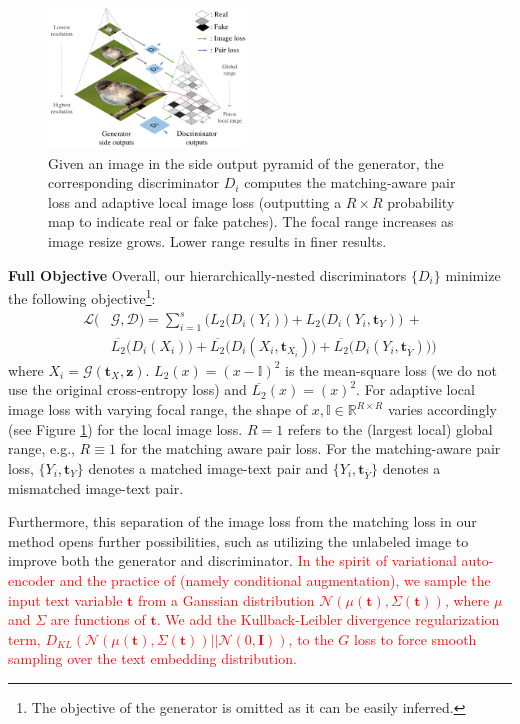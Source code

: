\documentclass[10pt,twocolumn,letterpaper]{article}
\begin{document}
\begin{figure}[t]
	\centering
	\includegraphics[width=0.47\textwidth]{figure/loss.pdf}
	
	\caption{Given an image in the side output pyramid of the generator, the corresponding discriminator $D_i$ computes the matching-aware pair loss and adaptive local image loss (outputting a $R{\times}R$ probability map to indicate real or fake patches). The focal range increases as image resize grows. Lower range results in finer results. } 
	\label{fig:loss}
\end{figure}


\textbf{Full Objective } Overall, our hierarchically-nested discriminators $\{D_i\}$ minimize the following objective\footnote{The objective of the generator is omitted as it can be easily inferred.}:
\begin{equation}
\begin{split}
\mathcal{L}(& \mathcal{G}, \mathcal{D})  = \sum_{i=1}^{s} \Big(  L_2\big(D_i({Y}_i)\big) +  L_2\big(D_i({Y}_i, \bm t_{Y})\big) \, + \\ 
& \overline{L_2}\big(D_i({X}_i)\big)  + \overline{L_2}\big(D_i({X}_i, \bm{t}_{X_i})\big) + \overline{L_2}\big(D_i({Y}_i,  \bm{t}_{\overline{Y}})\big) \Big)
\end{split}
\end{equation}
where ${X}_i = \mathcal{G}(\bm{t}_{X}, \bm z)$. $L_2(x) = (x - \mathbb{I})^2$ is the mean-square loss (we do not use the original cross-entropy loss) and $\overline{L_2}(x) =(x)^2$. For adaptive local image loss with varying focal range, the shape of $x, \mathbb{I} \in \mathbb{R}^{R{\times}R}$ varies accordingly (see Figure \ref{fig:loss}) for the local image loss. $R=1$ refers to the (largest local) global range, e.g., $R\equiv1$ for the matching aware pair loss. For the matching-aware pair loss, 
$\{Y_i, \bm t_{Y}\}$ denotes a matched image-text pair and $\{Y_i, \bm{t}_{\overline{Y}}\}$ denotes a mismatched image-text pair.

Furthermore, this separation of the image loss from the matching loss in our method opens further possibilities, such as utilizing the unlabeled image to improve both the generator and discriminator.
\textcolor{red}{In the spirit of variational auto-encoder \cite{vae} and the practice of \cite{han2017stackgan} (namely conditional augmentation), we sample the input text variable $\bm t$ from a Ganssian distribution $\mathcal{N}(\mu({\bm t}), \Sigma({\bm t}))$, where $\mu$ and $\Sigma$ are functions of $\bm t$. We add the Kullback-Leibler divergence regularization term, $D_{KL}(\mathcal{N}(\mu({\bm t}), \Sigma({\bm t}) )|| \mathcal{N}(0, \bm{I}))$, to the $G$ loss to force smooth sampling over the text embedding distribution. }
\end{document}
